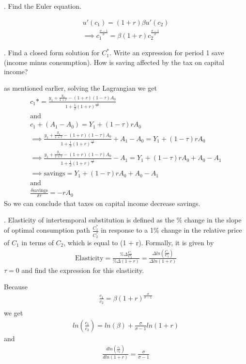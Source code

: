 \documentclass[11pt]{SelfArxOneColBMN}
\begin{document}
. Find the Euler equation.
\begin{solution}
\begin{eqnarray*}
u'(c_1) = (1 + r)\beta u'(c_2)\\
\implies c_1^\frac{\sigma - 1}{\sigma} = \beta(1 + r)c_2^\frac{\sigma - 1}{\sigma}
\end{eqnarray*}
\end{solution}

. Find a closed form solution for $C_1^*$. Write an expression for period 1 save (income minus consumption). How is saving affected by the tax on capital income?
\begin{solution}
as mentioned earlier, solving the Lagrangian we get
\begin{eqnarray*}
  c_1* = \frac{y_1 + \frac{y_2}{1 + r} - (1 + r)(1 - \tau)A_0}{1 + \frac{1}{\beta}(1 + r)^\frac{-1}{\sigma}}\\
  \text{and}\\
  c_1 + (A_1 - A_0) = Y_1 + (1 - \tau)rA_0\\
  \implies \frac{y_1 + \frac{y_2}{1 + r} - (1 + r)(1 - \tau)A_0}{1 + \frac{1}{\beta}(1 + r)^\frac{-1}{\sigma}} + A_1 - A_0 = Y_1 + (1 - \tau)rA_0\\
  \implies \frac{y_1 + \frac{y_2}{1 + r} - (1 + r)(1 - \tau)A_0}{1 + \frac{1}{\beta}(1 + r)^\frac{-1}{\sigma}} - A_1 = Y_1 + (1 - \tau)rA_0 + A_0 - A_1\\
  \implies \text{savings} = Y_1 + (1 - \tau)rA_0 + A_0 - A_1\\
  \text{and}\\
  \frac{\delta\text{savings}}{\delta\tau} = -rA_0
\end{eqnarray*}
So we can conclude that taxes on capital income decrease savings.\\
\end{solution}

. Elasticity of intertemporal substitution is defined as the \% change in the slope of optimal consumption path $\frac{C_1^*}{C_2^*}$ in response to a 1\% change in the relative price of $C_1$ in terms of $C_2$, which is equal to (1 + r). Formally, it is given by
\begin{eqnarray*}
  \text{Elasticity} = \frac{\% \Delta \frac{C_1}{C_2}}{\% \Delta(1 + r)} = \frac{\Delta ln(\frac{C_1}{C_2})}{\Delta ln(1 + r)}
\end{eqnarray*}
\indent $\tau = 0$ and find the expression for this elasticity.
\begin{solution}
  Because
  \begin{eqnarray*}
    \frac{c_1}{c_2} = \beta(1 + r)^\frac{\sigma}{\sigma - 1}\\
  \end{eqnarray*}
  we get
  \begin{eqnarray*}
    ln(\frac{c_1}{c_2}) = ln(\beta) + \frac{\sigma}{\sigma - 1}ln(1 + r)
  \end{eqnarray*}
  and
  \begin{eqnarray*}
    \frac{dln(\frac{c_1}{c_2} )}{dln(1 + r)} = \frac{\sigma}{\sigma - 1}
  \end{eqnarray*} 
\end{solution}
\end{document}
